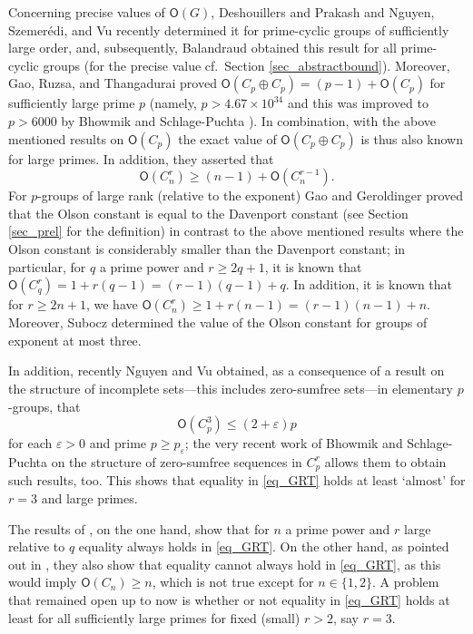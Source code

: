 \documentclass{amsart}
\theoremstyle{definition}
\numberwithin{equation}{section}
\begin{document}
Concerning precise values of ${\mathsf{O}}(G)$, Deshouillers and Prakash \cite{Deshouillers} and Nguyen, Szemer{\'e}di, and Vu \cite{vanvu} recently determined it for prime-cyclic groups of sufficiently large order, and, subsequently, Balandraud \cite{eric} obtained this result for all prime-cyclic groups (for the precise value cf.~Section \ref{sec_abstractbound}).
Moreover, Gao, Ruzsa, and Thangadurai \cite{ruzsa} proved ${\mathsf{O}}(C_p \oplus C_p)=(p-1) + {\mathsf{O}}(C_p)$ for sufficiently large prime $p$ (namely, $p> 4.67 \times 10^{34}$ and this was improved to $p>6000$ by Bhowmik and Schlage-Puchta \cite{bhowmik}). In combination, with the above mentioned results on ${\mathsf{O}}(C_p)$ the exact value of  ${\mathsf{O}}(C_p \oplus C_p)$ is thus also known for large primes. In addition, they asserted that
\begin{equation}
\label{eq_GRT}
{\mathsf{O}}(C_n^{r}) \ge (n-1)+{\mathsf{O}}(C_n^{r-1}).
\end{equation}
For $p$-groups of large rank (relative to the exponent) Gao and Geroldinger \cite{GaoGe} proved that the Olson constant is equal to the Davenport constant (see Section \ref{sec_prel} for the definition) in contrast to the above mentioned results where the Olson constant is considerably smaller than the Davenport constant; in particular, for $q$ a prime power and  $r\ge 2q + 1$, it is known that ${\mathsf{O}}(C_{q}^r)= 1 + r(q-1)= (r-1)(q-1) +q$.
In addition, it is known that for $r \ge 2n +1$, we have ${\mathsf{O}}(C_{n}^r)\ge 1 + r(n-1)= (r-1)(n-1) +n$. 
Moreover, Subocz \cite{sub} determined the value of the Olson constant for groups of exponent at most three.

In addition, recently Nguyen and Vu \cite{nguvu2} obtained, as a consequence of a result on the structure of incomplete sets---this includes zero-sumfree sets---in elementary $p$-groups, that 
\[{\mathsf{O}}(C_p^3)\le (2 + \varepsilon) p\] 
for each $\varepsilon > 0$ and prime $p\ge p_{\varepsilon}$; the very recent work of Bhowmik and Schlage-Puchta \cite{bsp2} on the structure of zero-sumfree sequences in $C_p^r$ allows them to obtain such results, too. This shows that equality in \eqref{eq_GRT} holds at least `almost' for $r=3$ and large primes. 

The results of \cite{GaoGe}, on the one hand, show that for $n$ a prime power and $r$ large relative to $q$ equality always holds in \eqref{eq_GRT}.
On the other hand, as pointed out in \cite{GaoGe1}, they also show that equality cannot always hold in \eqref{eq_GRT}, as this would imply ${\mathsf{O}}(C_n)\ge n$, which is not true except for $n\in \{1,2\}$. A problem that remained open up to now is whether or not equality in \eqref{eq_GRT} holds at least for all sufficiently large primes for fixed (small) $r>2$, say $r=3$.
 
\end{document}
